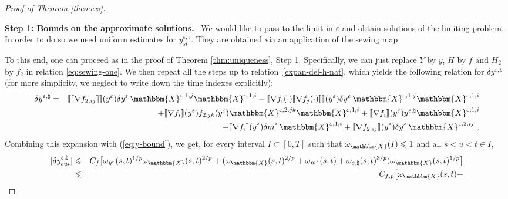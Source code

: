 \documentclass[11pt,reqno,oneside]{amsart}
\numberwithin{equation}{section}
\newcommand{\tmtextbf}[1]{{\bfseries{#1}}}
\newcommand{\ep}{\varepsilon}
\begin{document}
\begin{proof}[Proof of Theorem \ref{theo:exi}]
  \
  
  {\noindent}\tmtextbf{Step 1: Bounds on the approximate solutions.} \ We
  would like to pass to the limit in $\varepsilon$ and obtain solutions of the
  limiting problem. In order to do so we need uniform estimates for
  $y^{\varepsilon, \natural}_{s t}$. They are obtained via an application of
  the sewing map. 

 To this end, one can proceed as in the proof of Theorem \ref{thm:uniqueness}, Step 1. Specifically, we can just replace $Y$ by $y$, $H$ by $f$ and $H_{2}$ by $f_{2}$ in relation \eqref{eq:sewing-one}. We then repeat all the steps up to relation~\eqref{expan-del-h-nat}, which yields the following relation for $\delta y^{\varepsilon, \natural}$ (for more simplicity, we neglect to write down the time indexes explicitly):
  \begin{eqnarray}
\delta y^{\varepsilon, \natural}
    & = & \llbracket \llbracket \nabla f_{2,ij}  \rrbracket \rrbracket(y^{\ep}) \delta y^{\ep}\,\mathbbm{X}^{\varepsilon,1,j} \mathbbm{X}^{\varepsilon,1,i} 
    - \llbracket \nabla f_i (\cdot) \llbracket \nabla f_j (\cdot) \rrbracket \rrbracket(y^{\ep}) \delta y^{\ep}\, \mathbbm{X}^{\varepsilon,1,j} \mathbbm{X}^{\varepsilon,1,i} \nonumber \\
&  &\hspace{2cm} 
+ \llbracket\nabla f_i  \rrbracket(y^{\ep}) f_{2,jk} (y^{\ep}) \mathbbm{X}^{\varepsilon,2,jk} \mathbbm{X}^{\varepsilon,1,i} 
+ \llbracket \nabla f_i \rrbracket(y^{\ep}) y^{\ep,\natural} \mathbbm{X}^{\varepsilon,1,i}\nonumber \\
&  &\hspace{3cm} 
+\llbracket \nabla f_i \rrbracket(y^{\ep}) \delta m^\varepsilon\, \mathbbm{X}^{\varepsilon,1,i} 
+ \llbracket \nabla f_{2,ij} \rrbracket(y^{\ep}) \delta y^{\ep}\, \mathbbm{X}^{\varepsilon,2,ij} \ .\label{expan-del-h-nat-y}
  \end{eqnarray}
Combining this expansion with (\ref{eq:y-bound}), we get, for every interval $I\subset [0,T]$ such that $\omega_{\mathbbm{X}}(I)\leqslant 1$ and all $s<u<t\in I$,
 \begin{eqnarray*}
| \delta y^{\varepsilon, \natural}_{s u t} |
& \leqslant &C_f\big[
     \omega_{y^{\varepsilon}} (s, t)^{1 / p} \omega_{\mathbbm{X}} (s, t)^{2 /
     p}+ ( \omega_{\mathbbm{X}} (s, t)^{2 / p} +
     \omega_{m^{\varepsilon}} (s, t) + \omega_{\varepsilon, \natural} (s,
     t)^{3 / p}) \omega_{\mathbbm{X}} (s, t)^{1 / p} \big]\\
		&\leqslant &C_{f,p} \big[\omega_{\mathbbm{X}} (s, t) +

\end{eqnarray*}
\end{proof}
\end{document}

